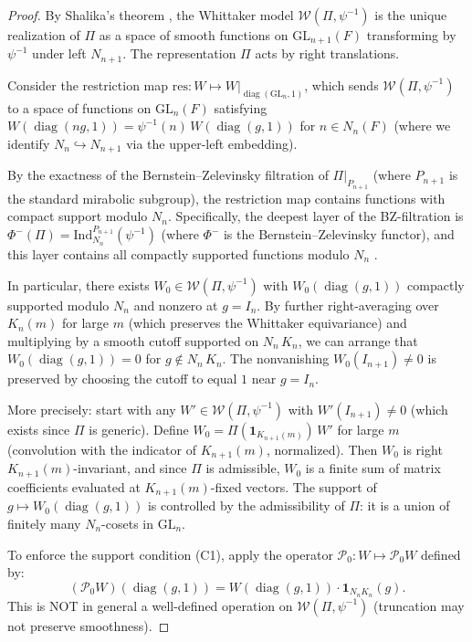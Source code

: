 \begin{proof}
By Shalika's theorem \cite{Shalika74}, the Whittaker model
$\mathcal{W}(\Pi, \psi^{-1})$ is the unique realization of $\Pi$ as a space
of smooth functions on $\mathrm{GL}_{n+1}(F)$ transforming by $\psi^{-1}$
under left $N_{n+1}$. The representation $\Pi$ acts by right translations.

Consider the restriction map
$\mathrm{res} : W \mapsto W|_{\operatorname{diag}(\mathrm{GL}_n, 1)}$,
which sends $\mathcal{W}(\Pi, \psi^{-1})$ to a space of functions on
$\mathrm{GL}_n(F)$ satisfying $W(\operatorname{diag}(ng,1)) = \psi^{-1}(n)\,W(\operatorname{diag}(g,1))$
for $n \in N_n(F)$ (where we identify $N_n \hookrightarrow N_{n+1}$ via
the upper-left embedding).

By the exactness of the Bernstein--Zelevinsky filtration of $\Pi|_{P_{n+1}}$
(where $P_{n+1}$ is the standard mirabolic subgroup), the restriction map
contains functions with compact support modulo $N_n$. Specifically, the
deepest layer of the BZ-filtration is $\Phi^{-}(\Pi) = \mathrm{Ind}_{N_n}^{P_{n+1}}(\psi^{-1})$
(where $\Phi^{-}$ is the Bernstein--Zelevinsky functor), and this layer
contains all compactly supported functions modulo $N_n$ \cite{BZ77}.

In particular, there exists $W_0 \in \mathcal{W}(\Pi, \psi^{-1})$ with
$W_0(\operatorname{diag}(g,1))$ compactly supported modulo $N_n$ and nonzero
at $g = I_n$. By further right-averaging over $K_n(m)$ for large $m$
(which preserves the Whittaker equivariance) and multiplying by a
smooth cutoff supported on $N_n\,K_n$, we can arrange that
$W_0(\operatorname{diag}(g,1)) = 0$ for $g \notin N_n\,K_n$. The nonvanishing
$W_0(I_{n+1}) \neq 0$ is preserved by choosing the cutoff to equal $1$ near
$g = I_n$.

More precisely: start with any $W' \in \mathcal{W}(\Pi, \psi^{-1})$ with
$W'(I_{n+1}) \neq 0$ (which exists since $\Pi$ is generic). Define
$W_0 = \Pi(\mathbf{1}_{K_{n+1}(m)})\,W'$ for large $m$ (convolution with
the indicator of $K_{n+1}(m)$, normalized). Then $W_0$ is right $K_{n+1}(m)$-invariant,
and since $\Pi$ is admissible, $W_0$ is a finite sum of matrix coefficients
evaluated at $K_{n+1}(m)$-fixed vectors. The support of
$g \mapsto W_0(\operatorname{diag}(g,1))$ is controlled by the admissibility
of $\Pi$: it is a union of finitely many $N_n$-cosets in $\mathrm{GL}_n$.

To enforce the support condition (C1), apply the operator
$\mathcal{P}_0 : W \mapsto \mathcal{P}_0 W$ defined by:
\[
  (\mathcal{P}_0 W)(\operatorname{diag}(g,1))
  = W(\operatorname{diag}(g,1)) \cdot \mathbf{1}_{N_n K_n}(g).
\]
This is NOT in general a well-defined operation on
$\mathcal{W}(\Pi, \psi^{-1})$ (truncation may not preserve smoothness).


\end{proof}
